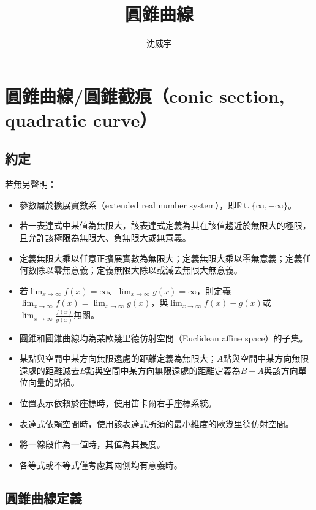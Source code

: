 \documentclass[a4paper,12pt]{article}
\begin{document}
\title{圓錐曲線}
\author{沈威宇}
\date{\temtoday}
\titletocdoc
\section{圓錐曲線/圓錐截痕（conic section, quadratic curve）}
\subsection{約定}
若無另聲明：
\begin{itemize}
\item 參數屬於擴展實數系（extended real number system），即$\mathbb{R}\cup\{\infty,-\infty\}$。
\item 若一表達式中某值為無限大，該表達式定義為其在該值趨近於無限大的極限，且允許該極限為無限大、負無限大或無意義。
\item 定義無限大乘以任意正擴展實數為無限大；定義無限大乘以零無意義；定義任何數除以零無意義；定義無限大除以或減去無限大無意義。
\item 若$\lim_{x\to\infty}f(x)=\infty$、$\lim_{x\to\infty}g(x)=\infty$，則定義$\lim_{x\to\infty}f(x)=\lim_{x\to\infty}g(x)$，與$\lim_{x\to\infty}f(x)-g(x)$或$\lim_{x\to\infty}\frac{f(x)}{g(x)}$無關。
\item 圓錐和圓錐曲線均為某歐幾里德仿射空間（Euclidean affine space）的子集。
\item 某點與空間中某方向無限遠處的距離定義為無限大；$A$點與空間中某方向無限遠處的距離減去$B$點與空間中某方向無限遠處的距離定義為$B-A$與該方向單位向量的點積。
\item 位置表示依賴於座標時，使用笛卡爾右手座標系統。
\item 表達式依賴空間時，使用該表達式所須的最小維度的歐幾里德仿射空間。
\item 將一線段作為一值時，其值為其長度。
\item 各等式或不等式僅考慮其兩側均有意義時。
\end{itemize}
\subsection{圓錐曲線定義}
\end{document}
